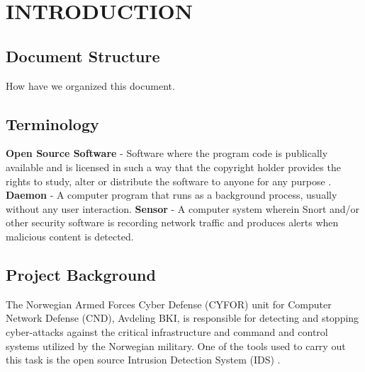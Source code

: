 \chapter{INTRODUCTION}

\section{Document Structure}
How have we organized this document.

\section{Terminology}
\textbf{Open Source Software} - Software where the program code is publically
available and is licensed in such a way that the copyright holder provides the rights to
study, alter or distribute the software to anyone for any purpose
\cite{OpenSourceSoftware}.
\newline
\textbf{Daemon} - A computer program that runs as a background process, usually
without any user interaction.
\newline
\textbf{Sensor} - A computer system wherein Snort and/or other security software
is recording network traffic and produces alerts when malicious content is detected.

\section{Project Background}
The Norwegian Armed Forces Cyber Defense (CYFOR) unit for Computer Network Defense
(CND), Avdeling BKI, is responsible for detecting and stopping cyber-attacks against the
critical infrastructure and command and control systems utilized by the Norwegian military.
One of the tools used to carry out this task is the open source Intrusion
Detection System (IDS) \snort{} \cite{Snort}.

